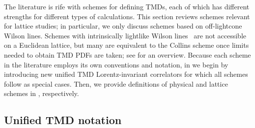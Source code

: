 \documentclass[11pt,a4paper]{article}
\begin{document}
The literature is rife with schemes for defining TMDs,
each of which has different strengths for different types of calculations.
This section reviews schemes relevant for lattice studies;
in particular, we only discuss schemes based on off-lightcone Wilson lines.
Schemes with intrinsically lightlike Wilson 
lines~\cite{Becher:2010tm, Becher:2011dz, GarciaEchevarria:2011rb, Chiu:2012ir, Li:2016axz, Ebert:2018gsn}
are not accessible on a Euclidean lattice, but many are equivalent to the Collins scheme once limits needed to obtain TMD PDFs are taken; see  for an overview.
Because each scheme in the literature employs its own conventions and notation,
in  we begin by introducing new unified TMD Lorentz-invariant correlators for which all schemes follow as special cases.
Then, we provide definitions of physical and lattice schemes in , respectively.




\subsection{Unified TMD notation}
\label{sec:tmd_defs}
\end{document}
